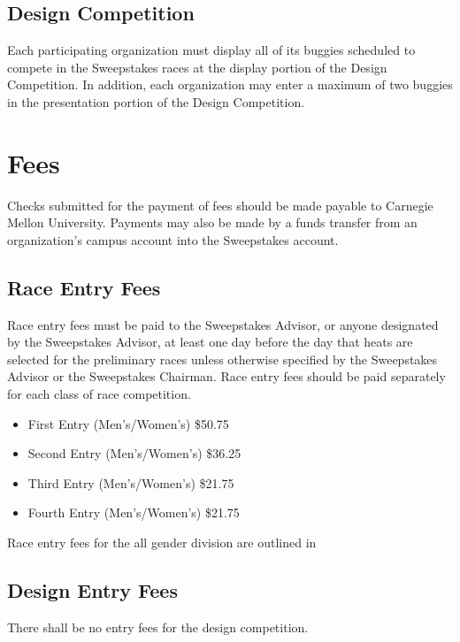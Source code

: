 \subsection{Design Competition}

	Each participating organization must display all of its buggies scheduled to compete in the Sweepstakes races at the display portion of the Design Competition. In addition, each organization may enter a maximum of two buggies in the presentation portion of the Design Competition.

\section{Fees}

	Checks submitted for the payment of fees should be made payable to Carnegie Mellon University. Payments may also be made by a funds transfer from an organization's campus account into the Sweepstakes account. 

\subsection{Race Entry Fees}

	Race entry fees must be paid to the Sweepstakes Advisor, or anyone designated by the Sweepstakes Advisor, at least one day before the day that heats are selected for the preliminary races unless otherwise specified by the Sweepstakes Advisor or the Sweepstakes Chairman. Race entry fees should be paid separately for each class of race competition.

	\begin{itemize}
		\item First Entry (Men's/Women's) \$50.75
		\item Second Entry (Men's/Women's) \$36.25
		\item Third Entry (Men's/Women's) \$21.75
		\item Fourth Entry (Men's/Women's) \$21.75
	\end{itemize}

	Race entry fees for the all gender division are outlined in \label{All Gender}

\subsection{Design Entry Fees}

	There shall be no entry fees for the design competition.


